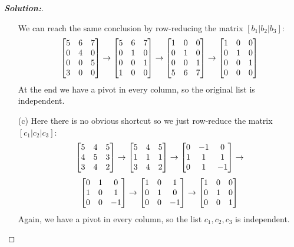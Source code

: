 \documentclass[a4paper]{amsart}
\theoremstyle{definition}
\newenvironment{solution}{\begin{proof}[\textbf{Solution:}] \vphantom{u}}{\end{proof}}
\begin{document}
\begin{solution}
\begin{itemize}
   We can reach the same conclusion by row-reducing the matrix
   $[b_1|b_2|b_3]$: 
   \[ 
     \left[\begin{matrix} 5 & 6 & 7 \\
          0 & 4 & 0 \\
          0 & 0 & 5 \\
          3 & 0 & 0
     \end{matrix}\right] 
     \to
     \left[\begin{matrix} 5 & 6 & 7 \\
          0 & 1 & 0 \\
          0 & 0 & 1 \\
          1 & 0 & 0
     \end{matrix}\right] 
     \to
     \left[\begin{matrix} 1 & 0 & 0 \\
          0 & 1 & 0 \\
          0 & 0 & 1 \\
          5 & 6 & 7
     \end{matrix}\right] 
     \to
     \left[\begin{matrix} 1 & 0 & 0 \\
          0 & 1 & 0 \\
          0 & 0 & 1 \\
          0 & 0 & 0
     \end{matrix}\right] 
   \]
   At the end we have a pivot in every column, so the original list is
   independent.
  \item[(c)] Here there is no obvious shortcut so we just row-reduce
   the matrix $[c_1|c_2|c_3]$:
   \[
    \left[\begin{matrix} 5 & 4 & 5 \\ 
         4 & 5 & 3 \\
         3 & 4 & 2 \end{matrix}\right] 
    \to
    \left[\begin{matrix} 5 & 4 & 5 \\ 
         1 & 1 & 1 \\
         3 & 4 & 2 \end{matrix}\right] 
    \to
    \left[\begin{matrix} 0 &-1 & 0 \\ 
         1 & 1 & 1 \\
         0 & 1 &-1 \end{matrix}\right] 
    \to
   \] \[
    \left[\begin{matrix} 0 & 1 & 0 \\ 
         1 & 0 & 1 \\
         0 & 0 &-1 \end{matrix}\right] 
    \to
    \left[\begin{matrix} 1 & 0 & 1 \\
         0 & 1 & 0 \\ 
         0 & 0 &-1 \end{matrix}\right] 
    \to
    \left[\begin{matrix} 1 & 0 & 0 \\
         0 & 1 & 0 \\ 
         0 & 0 & 1 \end{matrix}\right] 
   \]
   Again, we have a pivot in every column, so the list $c_1,c_2,c_3$ is
   independent.
 \end{itemize}
\end{solution}
\end{document}
